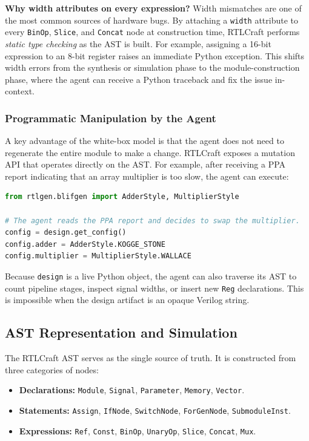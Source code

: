 \documentclass[11pt]{article}
\begin{document}
\textbf{Why width attributes on every expression?} Width mismatches are one of the most common sources of hardware bugs. By attaching a \texttt{width} attribute to every \texttt{BinOp}, \texttt{Slice}, and \texttt{Concat} node at construction time, RTLCraft performs \textit{static type checking} as the AST is built. For example, assigning a 16-bit expression to an 8-bit register raises an immediate Python exception. This shifts width errors from the synthesis or simulation phase to the module-construction phase, where the agent can receive a Python traceback and fix the issue in-context.

\subsubsection{Programmatic Manipulation by the Agent}

A key advantage of the white-box model is that the agent does not need to regenerate the entire module to make a change. RTLCraft exposes a mutation API that operates directly on the AST. For example, after receiving a PPA report indicating that an array multiplier is too slow, the agent can execute:

\begin{lstlisting}[language=Python, caption={Agent-driven surgical modification of arithmetic style}, label={lst:agent_patch}]
from rtlgen.blifgen import AdderStyle, MultiplierStyle

# The agent reads the PPA report and decides to swap the multiplier.
config = design.get_config()
config.adder = AdderStyle.KOGGE_STONE
config.multiplier = MultiplierStyle.WALLACE
\end{lstlisting}

Because \texttt{design} is a live Python object, the agent can also traverse its AST to count pipeline stages, inspect signal widths, or insert new \texttt{Reg} declarations. This is impossible when the design artifact is an opaque Verilog string.

\subsection{AST Representation and Simulation}
\label{sec:ast}

The RTLCraft AST serves as the single source of truth. It is constructed from three categories of nodes:

\begin{itemize}
    \item \textbf{Declarations:} \texttt{Module}, \texttt{Signal}, \texttt{Parameter}, \texttt{Memory}, \texttt{Vector}.
    \item \textbf{Statements:} \texttt{Assign}, \texttt{IfNode}, \texttt{SwitchNode}, \texttt{ForGenNode}, \texttt{SubmoduleInst}.
    \item \textbf{Expressions:} \texttt{Ref}, \texttt{Const}, \texttt{BinOp}, \texttt{UnaryOp}, \texttt{Slice}, \texttt{Concat}, \texttt{Mux}.
\end{itemize}
\end{document}
